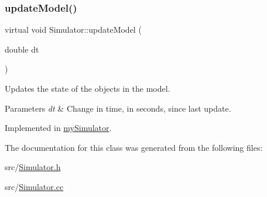 \subsubsection{\texorpdfstring{updateModel()}{updateModel()}}
{\footnotesize\ttfamily virtual void Simulator\+::update\+Model (\begin{DoxyParamCaption}\item[{double}]{dt }\end{DoxyParamCaption})\hspace{0.3cm}{\ttfamily [pure virtual]}}



Updates the state of the objects in the model. 


\begin{DoxyParams}{Parameters}
{\em dt} & Change in time, in seconds, since last update. \\
\hline
\end{DoxyParams}


Implemented in \mbox{\hyperlink{classmy_simulator_a76beefaa645d7785578a59b9f9d41dc9}{my\+Simulator}}.



The documentation for this class was generated from the following files\+:\begin{DoxyCompactItemize}
\item 
src/\mbox{\hyperlink{_simulator_8h}{Simulator.\+h}}\item 
src/\mbox{\hyperlink{_simulator_8cc}{Simulator.\+cc}}\end{DoxyCompactItemize}
